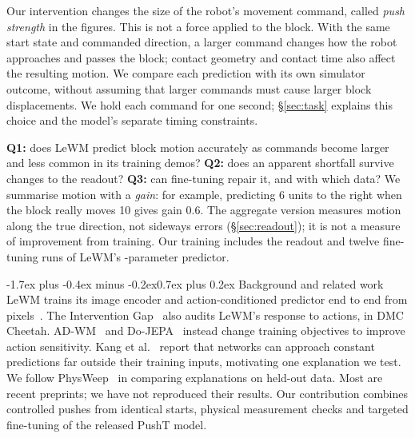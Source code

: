 \documentclass[10pt,twocolumn,a4paper]{article}
\makeatletter
\renewcommand\section{\@startsection{section}{1}{\z@}%
  {-1.7ex plus -0.4ex minus -0.2ex}{0.7ex plus 0.2ex}%
  {\normalfont\large\bfseries\color{accent}}}
\makeatother
\begin{document}
Our intervention changes the size of the robot's movement command, called \emph{push
strength} in the figures. This is not a force applied to the block. With the same start
state and commanded direction, a larger command changes how the robot approaches and
passes the block; contact geometry and contact time also affect the resulting motion.
We compare each prediction with its own simulator outcome, without assuming that larger
commands must cause larger block displacements. We hold each command for one second;
\S\ref{sec:task} explains this choice and the model's separate timing constraints.

\textbf{Q1:} does LeWM predict block motion accurately as commands become larger and
less common in its training demos? \textbf{Q2:} does an apparent shortfall survive
changes to the readout? \textbf{Q3:} can fine-tuning repair it, and with which data?
We summarise motion with a \emph{gain}: for example, predicting 6 units to the right
when the block really moves 10 gives gain 0.6. The aggregate version measures motion
along the true direction, not sideways errors (\S\ref{sec:readout}); it is not a measure
of improvement from training. Our training includes the readout and twelve fine-tuning
runs of LeWM's \ftParameters-parameter predictor.

\section{Background and related work}
LeWM trains its image encoder and action-conditioned predictor end to end from
pixels~\cite{maes2026lewm}. The Intervention Gap~\cite{vakalis2026gap} also audits LeWM's
response to actions, in DMC Cheetah. AD-WM~\cite{qiu2026adwm} and
Do-JEPA~\cite{resani2026dojepa} instead change training objectives to improve action
sensitivity. Kang et al.~\cite{kang2023extrapolate} report that networks can approach
constant predictions far outside their training inputs, motivating one explanation we
test. We follow PhysWeep~\cite{khanbayov2026physweep} in comparing explanations on
held-out data. Most are recent preprints; we have not reproduced their results.
Our contribution combines controlled pushes from identical starts, physical measurement
checks and targeted fine-tuning of the released PushT model.
\end{document}
